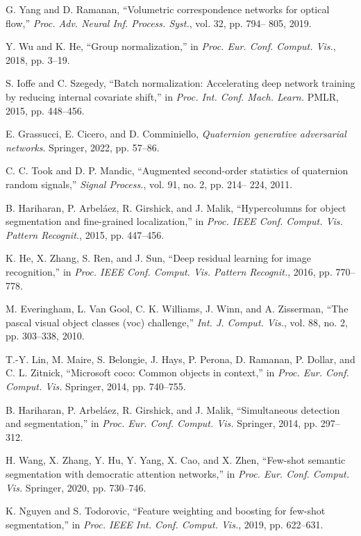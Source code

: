 \documentclass[lettersize,journal]{IEEEtran}
\begin{document}
\begin{thebibliography}{10}
G. Yang and D. Ramanan, “Volumetric correspondence networks for optical flow,” \textit{Proc. Adv. Neural Inf. Process. Syst.}, vol. 32, pp. 794– 805, 2019.

Y. Wu and K. He, “Group normalization,” in \textit{Proc. Eur. Conf. Comput. Vis.}, 2018, pp. 3–19.

S. Ioffe and C. Szegedy, “Batch normalization: Accelerating deep network training by reducing internal covariate shift,” in \textit{Proc. Int. Conf. Mach. Learn.} PMLR, 2015, pp. 448–456.

E. Grassucci, E. Cicero, and D. Comminiello, \textit{Quaternion generative adversarial networks}. Springer, 2022, pp. 57–86.

C. C. Took and D. P. Mandic, “Augmented second-order statistics of quaternion random signals,” \textit{Signal Process.}, vol. 91, no. 2, pp. 214– 224, 2011.

B. Hariharan, P. Arbeláez, R. Girshick, and J. Malik, “Hypercolumns for object segmentation and fine-grained localization,” in \textit{Proc. IEEE Conf. Comput. Vis. Pattern Recognit.}, 2015, pp. 447–456.

K. He, X. Zhang, S. Ren, and J. Sun, “Deep residual learning for image recognition,” in \textit{Proc. IEEE Conf. Comput. Vis. Pattern Recognit.}, 2016, pp. 770–778.

M. Everingham, L. Van Gool, C. K. Williams, J. Winn, and A. Zisserman, “The pascal visual object classes (voc) challenge,” \textit{Int. J. Comput. Vis.}, vol. 88, no. 2, pp. 303–338, 2010.

T.-Y. Lin, M. Maire, S. Belongie, J. Hays, P. Perona, D. Ramanan, P. Dollar, and C. L. Zitnick, “Microsoft coco: Common objects in context,” in \textit{Proc. Eur. Conf. Comput. Vis.} Springer, 2014, pp. 740–755.

B. Hariharan, P. Arbeláez, R. Girshick, and J. Malik, “Simultaneous detection and segmentation,” in \textit{Proc. Eur. Conf. Comput. Vis.} Springer, 2014, pp. 297–312.

H. Wang, X. Zhang, Y. Hu, Y. Yang, X. Cao, and X. Zhen, “Few-shot semantic segmentation with democratic attention networks,” in \textit{Proc. Eur. Conf. Comput. Vis.} Springer, 2020, pp. 730–746.

K. Nguyen and S. Todorovic, “Feature weighting and boosting for few-shot segmentation,” in \textit{Proc. IEEE Int. Conf. Comput. Vis.}, 2019, pp. 622–631.


\end{thebibliography}
\end{document}
